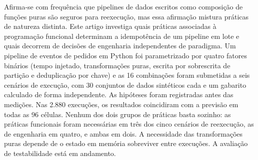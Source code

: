 Afirma-se com frequência que pipelines de dados escritos como composição de funções puras são seguros para reexecução, mas essa afirmação mistura práticas de natureza distinta. Este artigo investiga quais práticas associadas à programação funcional determinam a idempotência de um pipeline em lote e quais decorrem de decisões de engenharia independentes de paradigma. Um pipeline de eventos de pedidos em Python foi parametrizado por quatro fatores binários (tempo injetado, transformações puras, escrita por sobrescrita de partição e deduplicação por chave) e as 16 combinações foram submetidas a seis cenários de execução, com 30 conjuntos de dados sintéticos cada e um gabarito calculado de forma independente. As hipóteses foram registradas antes das medições. Nas 2.880 execuções, os resultados coincidiram com a previsão em todas as 96 células. Nenhum dos dois grupos de práticas basta sozinho: as práticas funcionais foram necessárias em três dos cinco cenários de reexecução, as de engenharia em quatro, e ambas em dois. A necessidade das transformações puras depende de o estado em memória sobreviver entre execuções. A avaliação de testabilidade está em andamento.
